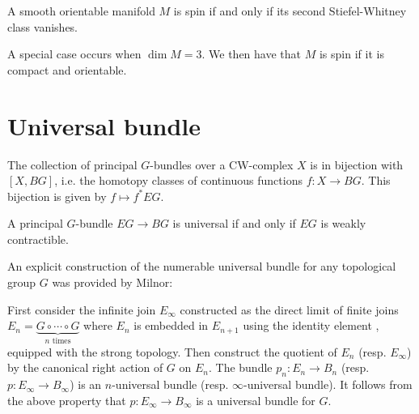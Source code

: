 	\begin{property}
		A smooth orientable manifold $M$ is spin if and only if its second Stiefel-Whitney class vanishes.
	\end{property}
	\begin{property}
		A special case occurs when $\dim M = 3$. We then have that $M$ is spin if it is compact and orientable.
	\end{property}
	
	
\section{Universal bundle}

	
	\begin{property}[Classification]
		The collection of principal $G$-bundles over a CW-complex $X$ is in bijection with $[X, BG]$, i.e. the homotopy classes of continuous functions $f:X\rightarrow BG$. This bijection is given by $f\mapsto f^*EG$.
	\end{property}
	
	\begin{property}
		A principal $G$-bundle $EG\rightarrow BG$ is universal if and only if $EG$ is weakly contractible.
	\end{property}
	
	
	An explicit construction of the numerable universal bundle for any topological group $G$ was provided by Milnor:
	\begin{construct}[Milnor]
		First consider the infinite join $E_\infty$ constructed as the direct limit of finite joins $E_n=\underbrace{G\circ\cdots\circ G}_{n\text{ times}}$ where $E_n$ is embedded in $E_{n+1}$ using the identity element , equipped with the strong topology. Then construct the quotient of $E_n$ (resp. $E_\infty$) by the canonical right action of $G$ on $E_n$. The bundle $p_n:E_n\rightarrow B_n$ (resp. $p:E_\infty\rightarrow B_\infty$) is an $n$-universal bundle (resp. $\infty$-universal bundle). It follows from the above property that $p:E_\infty\rightarrow B_\infty$ is a universal bundle for $G$.
	\end{construct}
